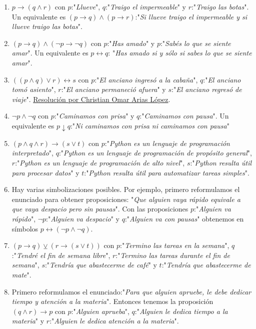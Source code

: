 \documentclass[a4paper]{article}
\newcommand{\then}{\to}
\newcommand{\eq}{\leftrightarrow}
\newcommand{\xor}{\veebar}
\begin{document}
\begin{enumerate}
\begin{enumerate} [label=(\alph*)]
		\item $p \then  ( q  \land  r )$ con $p$:"\textit{Llueve}", $q$:"\textit{Traigo el impermeable}" y $r$:"\textit{Traigo las botas}". Un equivalente es $(p \then q) \land (p \then r )$:"\textit{Si llueve traigo el impermeable y si llueve traigo las botas}".
		\item $( p \then  q )  \land  ( \neg p \then  \neg q )$ con $p$:"\textit{Has amado}" y $p$:"\textit{Sabés lo que se siente amar}". Un equivalente es $p \eq  q$: "\textit{Has amado si y sólo si sabes lo que se siente amar}".
		\item $((p \land q) \lor r) \eq s$ con $p$:"\textit{El anciano ingresó a la cabaña}", $q$:"\textit{El anciano tomó asiento}", $r$:"\textit{El anciano permaneció afuera}" y $s$:"\textit{El anciano regresó de viaje}". \href{https://youtu.be/TgwraosKUuY?t=331}{Resolución por Christian Omar Arias López}.
		\item $\neg p  \land  \neg q$ con $p$:"\textit{Caminamos con prisa}" y $q$:"\textit{Caminamos con pausa}". Un equivalente es $p \downarrow  q$:"\textit{Ni caminamos con prisa ni caminamos con pausa}"
		\item $( p  \land  q  \land  r ) \then  ( s \lor  t )$ con $p$:"\textit{Python es un lenguaje de programación interpretado}", $q$:"\textit{Python es un lenguaje de programación  de propósito general}", $r$:"\textit{Python es un lenguaje de programación de alto nivel}", $s$:"\textit{Python resulta útil para procesar datos}" y $t$:"\textit{Python resulta útil para automatizar tareas simples}".
		\item Hay varias simbolizaciones posibles. Por ejemplo, primero reformulamos el enunciado para obtener proposiciones: "\textit{Que alguien vaya rápido equivale a que vaya despacio pero sin pausas}". Con las proposiciones $p$:"\textit{Alguien va rápido}", $\neg p$:"\textit{Alguien va despacio}" y $q$:"\textit{Alguien va con pausas}" obtenemos en símbolos $p \eq (\neg p \land \neg q)$.
		\item $( p \then  q ) \xor  ( r \then  ( s \lor  t) )$ con $p$:"\textit{Termino las tareas en la semana}", $q$:"\textit{Tendré el fin de semana libre}", $r$:"\textit{Termino las tareas durante el fin de semana}", $s$:"\textit{Tendría que abastecerme de café}" y $t$:"\textit{Tendría que abastecerme de mate}".
		\item Primero reformulamos el enunciado:"\textit{Para que alguien apruebe, le debe dedicar tiempo y atención a la materia}". Entonces tenemos la proposición $( q  \land  r ) \then  p$ con $p$:"\textit{Alguien aprueba}", $q$:"\textit{Alguien le dedica tiempo a la materia}" y $r$:"\textit{Alguien le dedica atención a la materia}".

\end{enumerate}
\end{enumerate}
\end{document}
